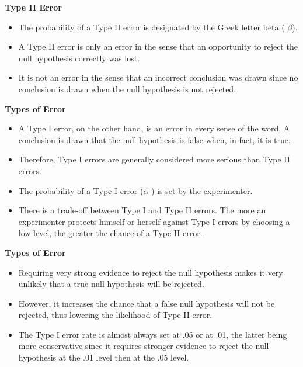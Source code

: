 
\noindent \textbf{Type II Error}
\begin{itemize}

\item The probability of a Type II error is designated by the Greek letter beta ( $\beta$).
\item A Type II error is only an error in the sense that an opportunity to reject the null hypothesis correctly was lost.
\item It is not an error in the sense that an incorrect conclusion was drawn since no conclusion is drawn when the null hypothesis is not rejected.
\end{itemize}


\noindent \textbf{Types of Error}
\large
\begin{itemize}
\item
A Type I error, on the other hand, is an error in every sense of the word. A conclusion is drawn that the null hypothesis is false when, in fact, it is true. \item Therefore, Type I errors are generally considered more serious than Type II errors.
\item
The probability of a Type I error ($\alpha$ ) is set by the experimenter. \item There is a trade-off between Type I and Type II errors. The more an experimenter protects himself or herself against Type I errors by choosing a low level, the greater the chance of a Type II error.
\end{itemize}


\noindent \textbf{Types of Error}
\large
\begin{itemize}
\item
Requiring very strong evidence to reject the null hypothesis makes it very unlikely that a true null hypothesis will be rejected. \item However, it increases the chance that a false null hypothesis will not be rejected, thus lowering the likelihood of Type II error.
\item
The Type I error rate is almost always set at .05 or at .01, the latter being more conservative since it requires stronger evidence to reject the null hypothesis at the .01 level then at the .05 level.
\end{itemize}




